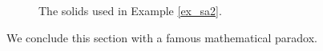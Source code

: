\begin{example}
\begin{figure}[H]
\centering
\qquad
{}
\caption{The solids used in Example \ref{ex_sa2}.}
\end{figure}


\end{example}


\fi


We conclude this section with a famous mathematical paradox.


